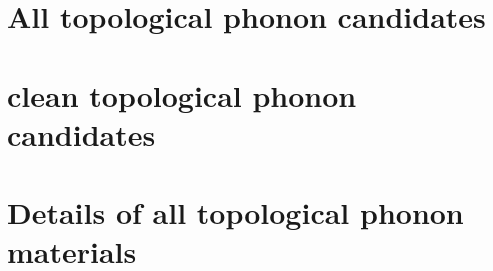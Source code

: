 \documentclass[amsmath,amssymb]{revtex4}
\begin{document}
\section{All topological phonon candidates}

\newpage\section{clean topological phonon candidates}

\newpage\section{Details of all topological phonon materials}


























































































\end{document}

